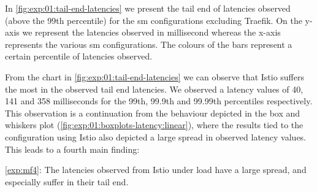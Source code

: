 In \cref{fig:exp:01:tail-end-latencies} we present the tail end of latencies observed (above the 99th percentile) for the \gls{sm} configurations excluding Traefik. On the y-axis we represent the latencies observed in millisecond whereas the x-axis represents the various \gls{sm} configurations. The colours of the bars represent a certain percentile of latencies observed.

From the chart in \cref{fig:exp:01:tail-end-latencies} we can observe that Istio suffers the most in the observed tail end latencies. We observed a latency values of 40, 141 and 358 milliseconds for the 99th, 99.9th and 99.99th percentiles respectively. This observation is a continuation from the behaviour depicted in the box and whiskers plot (\cref{fig:exp:01:boxplots-latency:linear}), where the results tied to the configuration using Istio also depicted a large spread in observed latency values. This leads to a fourth main finding:

\begin{shaded*}
    \noindent
    \ref{exp:mf4}: 
    The latencies observed from Istio under load have a large spread, and especially suffer in their tail end.
\end{shaded*}

